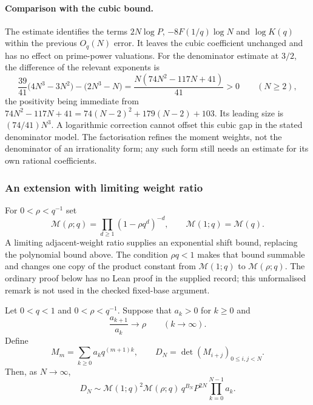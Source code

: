 \documentclass[11pt]{article}
\begin{document}
\paragraph{Comparison with the cubic bound.}
The estimate identifies the terms $2N\log P$, $-8F(1/q)\log N$
and $\log K(q)$ within the previous $O_q(N)$ error. It leaves the
cubic coefficient unchanged and has no effect on prime-power
valuations. For the denominator estimate at $3/2$, the difference
of the relevant exponents is
\[
 \frac{39}{41}\bigl(4N^3-3N^2\bigr)-\bigl(2N^3-N\bigr)
 =\frac{N(74N^2-117N+41)}{41}>0\qquad(N\ge2),
\]
the positivity being immediate from
$74N^2-117N+41=74(N-2)^2+179(N-2)+103$. Its leading size is $(74/41)N^3$. A logarithmic correction cannot
offset this cubic gap in the stated denominator model. The
factorisation refines the moment weights, not the denominator of
an irrationality form; any such form still needs an estimate for
its own rational coefficients.


\subsubsection*{An extension with limiting weight ratio}

For $0<\rho<q^{-1}$ set
\[
 \mathcal M(\rho;q)=\prod_{d\ge1}(1-\rho q^d)^{-d},
 \qquad \mathcal M(1;q)=\mathcal M(q).
\]
A limiting adjacent-weight ratio supplies an exponential shift
bound, replacing the polynomial bound above. The condition
$\rho q<1$ makes that bound summable and changes one copy of
the product constant from $\mathcal M(1;q)$ to $\mathcal M(\rho;q)$.
The ordinary proof below has no Lean proof in the supplied record;
this unformalised remark is not used in the checked fixed-base argument.

\begin{remark}\label{long1049:thm:geometric-ratio}
Let $0<q<1$ and $0<\rho<q^{-1}$. Suppose that $a_k>0$ for $k\ge0$ and
\[
 \frac{a_{k+1}}{a_k}\longrightarrow\rho\qquad(k\to\infty).
\]
Define
\[
 M_m=\sum_{k\ge0}a_kq^{(m+1)k},\qquad
 D_N=\det(M_{i+j})_{0\le i,j<N}.
\]
Then, as $N\to\infty$,
\begin{equation}\label{long1049:eq:ratio-limit}
 D_N\sim \mathcal M(1;q)^2\mathcal M(\rho;q)\,
 q^{B_N}P^{2N}\prod_{k=0}^{N-1}a_k.
\end{equation}
\end{remark}
\end{document}
